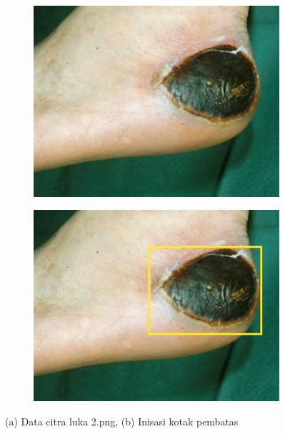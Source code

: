 \begin{figure}[H]
	\centering
	  \begin{subfigure}{0.3\textwidth}
		\centering{}
		\includegraphics[width=\textwidth]{gambar/gambar-3_2(b).jpg}
		\caption{}
	  \end{subfigure}  
	  \begin{subfigure}{0.3\textwidth}
		\centering{}
		\includegraphics[width=\textwidth]{gambar/rectangle.png}
		\caption{}
	  \end{subfigure}
	\caption{
		(a) Data citra luka 2.png, (b) Inisasi kotak pembatas
        }
  \end{figure}

